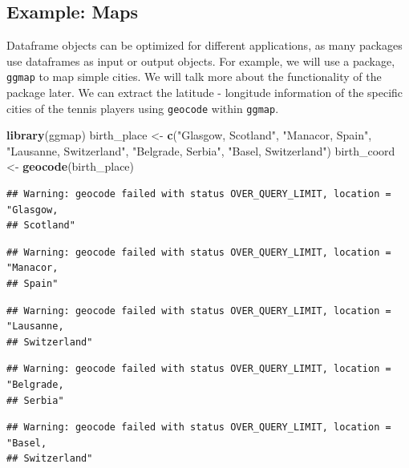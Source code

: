 \documentclass[12pt,]{krantz}
\newenvironment{Shaded}{\begin{snugshade}}{\end{snugshade}}
\newcommand{\KeywordTok}[1]{\textcolor[rgb]{0.27,0.27,0.27}{\textbf{#1}}}
\newcommand{\StringTok}[1]{\textcolor[rgb]{0.5,0.5,0.5}{#1}}
\newcommand{\NormalTok}[1]{#1}
\begin{document}
\subsection{Example: Maps}\label{example-maps}

Dataframe objects can be optimized for different applications, as many
packages use dataframes as input or output objects. For example, we will
use a package, \texttt{ggmap} to map simple cities. We will talk more
about the functionality of the package later. We can extract the
latitude - longitude information of the specific cities of the tennis
players using \texttt{geocode} within \texttt{ggmap}.

\begin{Shaded}
\begin{Highlighting}[]
\KeywordTok{library}\NormalTok{(ggmap)}
\NormalTok{birth_place <-}\StringTok{ }\KeywordTok{c}\NormalTok{(}\StringTok{"Glasgow, Scotland"}\NormalTok{, }\StringTok{"Manacor, Spain"}\NormalTok{, }\StringTok{"Lausanne, Switzerland"}\NormalTok{,}
                \StringTok{"Belgrade, Serbia"}\NormalTok{, }\StringTok{"Basel, Switzerland"}\NormalTok{)}
\NormalTok{birth_coord <-}\StringTok{ }\KeywordTok{geocode}\NormalTok{(birth_place)}
\end{Highlighting}
\end{Shaded}

\begin{verbatim}
## Warning: geocode failed with status OVER_QUERY_LIMIT, location = "Glasgow,
## Scotland"
\end{verbatim}

\begin{verbatim}
## Warning: geocode failed with status OVER_QUERY_LIMIT, location = "Manacor,
## Spain"
\end{verbatim}

\begin{verbatim}
## Warning: geocode failed with status OVER_QUERY_LIMIT, location = "Lausanne,
## Switzerland"
\end{verbatim}

\begin{verbatim}
## Warning: geocode failed with status OVER_QUERY_LIMIT, location = "Belgrade,
## Serbia"
\end{verbatim}

\begin{verbatim}
## Warning: geocode failed with status OVER_QUERY_LIMIT, location = "Basel,
## Switzerland"
\end{verbatim}
\end{document}
